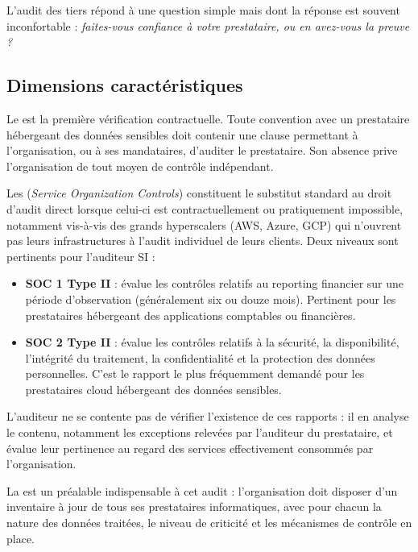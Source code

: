 L'audit des tiers répond à une question simple mais dont la réponse est souvent inconfortable : \textit{faites-vous confiance à votre prestataire, ou en avez-vous la preuve ?}

\subsection{Dimensions caractéristiques}

Le  est la première vérification contractuelle. Toute convention avec un prestataire hébergeant des données sensibles doit contenir une clause permettant à l'organisation, ou à ses mandataires, d'auditer le prestataire. Son absence prive l'organisation de tout moyen de contrôle indépendant.

Les  (\textit{Service Organization Controls}) constituent le substitut standard au droit d'audit direct lorsque celui-ci est contractuellement ou pratiquement impossible, notamment vis-à-vis des grands hyperscalers (AWS, Azure, GCP) qui n'ouvrent pas leurs infrastructures à l'audit individuel de leurs clients. Deux niveaux sont pertinents pour l'auditeur SI :

\begin{itemize}
    \item \textbf{SOC 1 Type II} : évalue les contrôles relatifs au reporting financier sur une période d'observation (généralement six ou douze mois). Pertinent pour les prestataires hébergeant des applications comptables ou financières.
    \item \textbf{SOC 2 Type II} : évalue les contrôles relatifs à la sécurité, la disponibilité, l'intégrité du traitement, la confidentialité et la protection des données personnelles. C'est le rapport le plus fréquemment demandé pour les prestataires cloud hébergeant des données sensibles.
\end{itemize}

L'auditeur ne se contente pas de vérifier l'existence de ces rapports : il en analyse le contenu, notamment les exceptions relevées par l'auditeur du prestataire, et évalue leur pertinence au regard des services effectivement consommés par l'organisation.

La  est un préalable indispensable à cet audit : l'organisation doit disposer d'un inventaire à jour de tous ses prestataires informatiques, avec pour chacun la nature des données traitées, le niveau de criticité et les mécanismes de contrôle en place.

